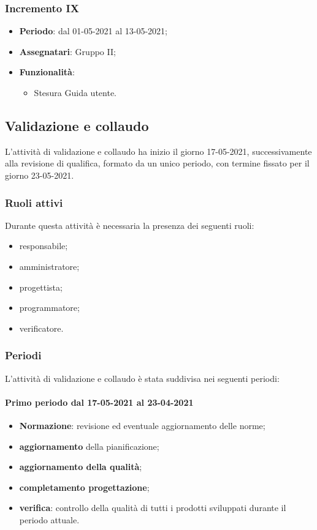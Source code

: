 \subsubsection{Incremento IX}
\begin{itemize}
	\item \textbf{Periodo}: dal 01-05-2021 al 13-05-2021;
	\item \textbf{Assegnatari}: Gruppo II;
	\item \textbf{Funzionalità}:
	\begin{itemize}
		\item Stesura Guida utente.
	\end{itemize}	
\end{itemize}

\subsection{Validazione e collaudo}
L'attività di validazione e collaudo ha inizio il giorno 17-05-2021, successivamente alla revisione di qualifica, formato da un unico periodo, con termine fissato per il giorno 23-05-2021. 

\subsubsection{Ruoli attivi} 
Durante questa attività è necessaria la presenza dei seguenti ruoli: 
\begin{itemize} 
	\item responsabile; 
	\item amministratore; 
	\item progettista; 
	\item programmatore; 
	\item verificatore.
\end{itemize}  
\subsubsection{Periodi}
L'attività di validazione e collaudo è stata suddivisa nei seguenti periodi: 
\paragraph{Primo periodo dal 17-05-2021 al 23-04-2021} 
\begin{itemize} 
	\item \textbf{Normazione}: revisione ed eventuale aggiornamento delle norme; 
	\item \textbf{aggiornamento} della pianificazione; 
	\item \textbf{aggiornamento della qualità}; 
	\item \textbf{completamento progettazione}; 
	\item \textbf{verifica}: controllo della qualità di tutti i prodotti sviluppati durante il periodo attuale. 
\end{itemize} 


